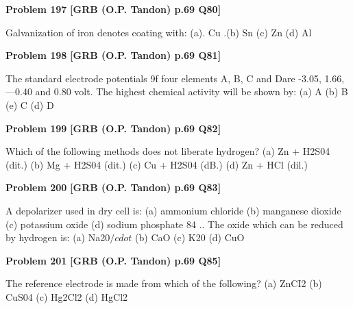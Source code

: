 \begin{problembox}
\textbf{Problem 197} \hfill \textbf{[GRB (O.P. Tandon) p.69 Q80]}
\label{q:ext-grb_all_questions-197}

Galvanization of iron denotes coating with: 
(a). Cu 
.(b) Sn 
(c) Zn 
(d) Al
\end{problembox}

\begin{problembox}
\textbf{Problem 198} \hfill \textbf{[GRB (O.P. Tandon) p.69 Q81]}
\label{q:ext-grb_all_questions-198}

The standard electrode potentials 9f four elements A, B, C and 
Dare -3.05, 1.66, ---0.40 and 0.80 volt. The highest chemical 
activity will be shown by: 
(a) A 
(b) B 
(e) C 
(d) D
\end{problembox}

\begin{problembox}
\textbf{Problem 199} \hfill \textbf{[GRB (O.P. Tandon) p.69 Q82]}
\label{q:ext-grb_all_questions-199}

Which of the following methods does not liberate hydrogen? 
(a) Zn + H2S04 (dit.) 
(b) Mg + H2S04 (dit.) 
(c) Cu + H2S04 (dB.) 
(d) Zn + HCl (dil.)
\end{problembox}

\begin{problembox}
\textbf{Problem 200} \hfill \textbf{[GRB (O.P. Tandon) p.69 Q83]}
\label{q:ext-grb_all_questions-200}

A depolarizer used in dry cell is: 
(a) ammonium chloride 
(b) manganese dioxide 
(c) potassium oxide 
(d) sodium phosphate 
84 .. The oxide which can be reduced by hydrogen is: 
(a) Na20$/cdot$ 
(b) CaO 
(c) K20 
(d) CuO
\end{problembox}

\begin{problembox}
\textbf{Problem 201} \hfill \textbf{[GRB (O.P. Tandon) p.69 Q85]}
\label{q:ext-grb_all_questions-201}

The reference electrode is made from which of the following? 
(a) ZnCI2 
(b) CuS04 
(c) Hg2Cl2 
(d) HgCl2
\end{problembox}

